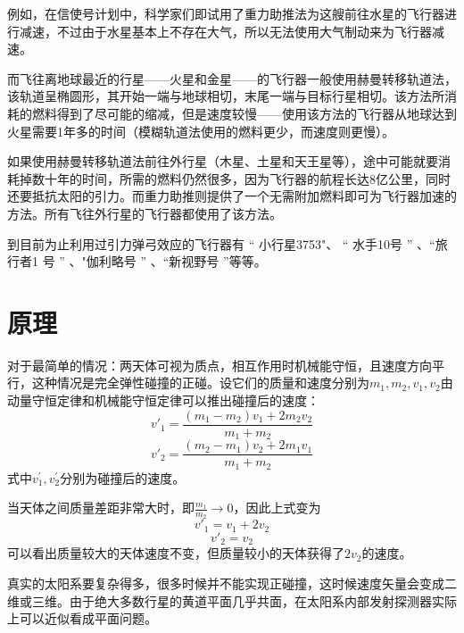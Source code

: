 \documentclass[UTF8,a4paper,10pt]{ctexart}
\begin{document}
\begin{multicols}{2}
    例如，在信使号计划中，科学家们即试用了重力助推法为这艘前往水星的飞行器进行减速，不过由于水星基本上不存在大气，所以无法使用大气制动来为飞行器减速。\par
    而飞往离地球最近的行星——火星和金星——的飞行器一般使用赫曼转移轨道法，该轨道呈椭圆形，其开始一端与地球相切，末尾一端与目标行星相切。该方法所消耗的燃料得到了尽可能的缩减，但是速度较慢——使用该方法的飞行器从地球达到火星需要1年多的时间（模糊轨道法使用的燃料更少，而速度则更慢）。\par
    如果使用赫曼转移轨道法前往外行星（木星、土星和天王星等），途中可能就要消耗掉数十年的时间，所需的燃料仍然很多，因为飞行器的航程长达8亿公里，同时还要抵抗太阳的引力。而重力助推则提供了一个无需附加燃料即可为飞行器加速的方法。所有飞往外行星的飞行器都使用了该方法。\par
    到目前为止利用过引力弹弓效应的飞行器有 “ 小行星3753"、 “ 水手10号 ” 、“旅行者1 号 ” 、"伽利略号 ” 、“新视野号 ”等等。\cite{wiki}\par
\section{原理}
    对于最简单的情况：两天体可视为质点，相互作用时机械能守恒，且速度方向平行，这种情况是完全弹性碰撞的正碰。设它们的质量和速度分别为$m_1,m_2,v_1,v_2$由动量守恒定律和机械能守恒定律可以推出碰撞后的速度：
    \begin{equation}
        v'_1 = \frac{(m_1-m_2)v_1 + 2m_2v_2}{m_1+m_2}
    \end{equation}
    \begin{equation}
        v'_2 = \frac{(m_2-m_1)v_2 + 2m_1v_1}{m_1+m_2}
    \end{equation}
    式中$v_1^{'},v_2^{'}$分别为碰撞后的速度。\par
    当天体之间质量差距非常大时，即$\frac{m_1}{m_2} \to 0$，因此上式变为
    \begin{equation}
        v'_1 = v_1 + 2v_2
    \end{equation}
    \begin{equation}
        v'_2 = v_2
    \end{equation}
    可以看出质量较大的天体速度不变，但质量较小的天体获得了$2v_2$的速度。\par
    真实的太阳系要复杂得多，很多时候并不能实现正碰撞，这时候速度矢量会变成二维或三维。由于绝大多数行星的黄道平面几乎共面，在太阳系内部发射探测器实际上可以近似看成平面问题。\par
    
\end{multicols}


\end{document}
